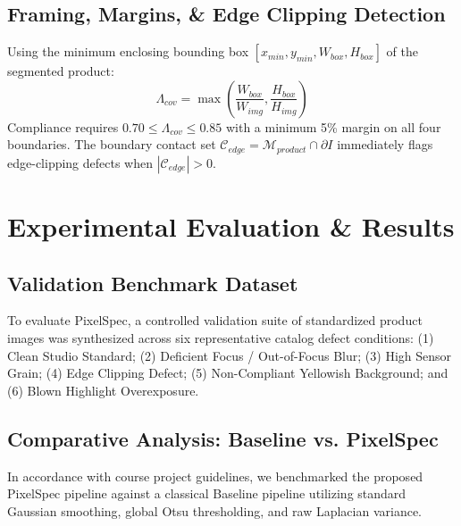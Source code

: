 \documentclass[conference]{IEEEtran}
\begin{document}
\subsection{Framing, Margins, & Edge Clipping Detection}
Using the minimum enclosing bounding box $[x_{min}, y_{min}, W_{box}, H_{box}]$ of the segmented product:
\begin{equation}
\Lambda_{cov} = \max\left(\frac{W_{box}}{W_{img}}, \frac{H_{box}}{H_{img}}\right)
\end{equation}
Compliance requires $0.70 \le \Lambda_{cov} \le 0.85$ with a minimum 5\% margin on all four boundaries. The boundary contact set $\mathcal{C}_{edge} = \mathcal{M}_{product} \cap \partial I$ immediately flags edge-clipping defects when $|\mathcal{C}_{edge}| > 0$.

\section{Experimental Evaluation & Results}

\subsection{Validation Benchmark Dataset}
To evaluate PixelSpec, a controlled validation suite of standardized product images was synthesized across six representative catalog defect conditions:
(1) Clean Studio Standard; (2) Deficient Focus / Out-of-Focus Blur; (3) High Sensor Grain; (4) Edge Clipping Defect; (5) Non-Compliant Yellowish Background; and (6) Blown Highlight Overexposure.

\subsection{Comparative Analysis: Baseline vs. PixelSpec}
In accordance with course project guidelines, we benchmarked the proposed PixelSpec pipeline against a classical Baseline pipeline utilizing standard Gaussian smoothing, global Otsu thresholding, and raw Laplacian variance.
\end{document}
